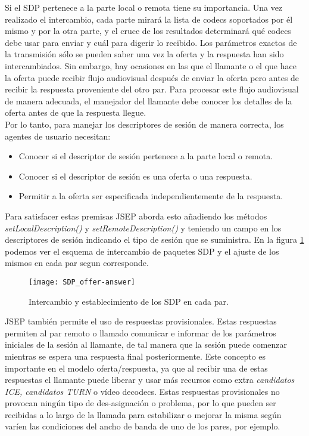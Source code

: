 Si el SDP pertenece a la parte local o remota tiene su importancia. Una vez realizado el intercambio, cada parte mirará la lista de codecs soportados por él mismo y por la otra parte, y el cruce de los resultados determinará qué codecs debe usar para enviar y cuál para digerir lo recibido. Los parámetros exactos de la transmisión sólo se pueden saber una vez la oferta y la respuesta han sido intercambiados. Sin embargo, hay ocasiones en las que el llamante o el que hace la oferta puede recibir flujo audiovisual después de enviar la oferta pero antes de recibir la respuesta proveniente del otro par. Para procesar este flujo audiovisual de manera adecuada, el manejador del llamante debe conocer los detalles de la oferta antes de que la respuesta llegue.\\

Por lo tanto, para manejar los descriptores de sesión de manera correcta, los agentes de usuario necesitan:

\begin{itemize}
\item Conocer si el descriptor de sesión pertenece a la parte local o remota.
\item Conocer si el descriptor de sesión es una oferta o una respuesta.
\item Permitir a la oferta ser especificada independientemente de la respuesta.
\end{itemize}

Para satisfacer estas premisas JSEP aborda esto añadiendo los métodos \emph{setLocalDescription()} y \emph{setRemoteDescription()} y teniendo un campo en los descriptores de sesión indicando el tipo de sesión que se suministra. En la figura \ref{fig:sdp-oferta-respuesta} podemos ver el esquema de intercambio de paquetes SDP y el ajuste de los mismos en cada par segun corresponde.\\

\begin{figure}[htb]
\centering
\texttt{[image: SDP\_offer-answer]}
\caption{Intercambio y establecimiento de los SDP en cada par.}
\label{fig:sdp-oferta-respuesta}
\end{figure}

JSEP también permite el uso de respuestas provisionales. Estas respuestas permiten al par remoto o llamado comunicar e informar de los parámetros iniciales de la sesión al llamante, de tal manera que la sesión puede comenzar mientras se espera una respuesta final posteriormente. Este concepto es importante en el modelo oferta/respuesta, ya que al recibir una de estas respuestas el llamante puede liberar y usar más recursos como extra \textit{candidatos ICE, candidatos TURN} o vídeo decodecs. Estas respuestas provisionales no provocan ningún tipo de des-asignación o problema, por lo que pueden ser recibidas a lo largo de la llamada para estabilizar o mejorar la misma según varíen las condiciones del ancho de banda de uno de los pares, por ejemplo.\\


